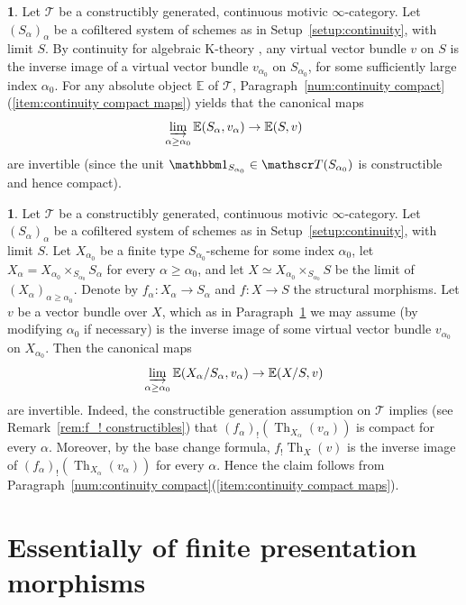 \documentclass[JEP,XML,SOM,Unicode]{cedram}
\newcommand{\T}{\mathscr T}
\newcommand{\E}{\mathbb E}
\newcommand{\un}{\mathbbm 1}
\DeclareMathOperator{\ilim}{\varinjlim}
\DeclareMathOperator{\Th}{Th}
\theoremstyle{remark}
\theoremstyle{definition}
\newtheorem{num}[thm]{}
\numberwithin{equation}{thm}
\begin{document}
\begin{num}\label{num:continuity cohomology}
Let $\T$ be a constructibly generated, continuous motivic $\infty$-category.
Let $(S_\alpha)_\alpha$ be a cofiltered system of schemes as in Setup~\ref{setup:continuity}, with limit $S$.
By continuity for algebraic K-theory \cite[Th.\,7.2]{TT}, any virtual vector bundle $v$ on $S$ is the inverse image of a virtual vector bundle $v_{\alpha_0}$ on $S_{\alpha_0}$, for some sufficiently large index $\alpha_0$.
For any absolute object $\E$ of $\T$, Paragraph~\ref{num:continuity compact}(\ref{item:continuity compact maps}) yields that the canonical maps
\[
\ilim_{\alpha\ge\alpha_0} \E(S_{\alpha}, v_{\alpha})
\to \E(S, v)
\]
are invertible (since the unit $\un_{S_{\alpha_0}} \in \T(S_{\alpha_0})$ is constructible and hence compact).
\end{num}

\begin{num}\label{num:continuity bivariant}
Let $\T$ be a constructibly generated, continuous motivic $\infty$-category.
Let $(S_\alpha)_\alpha$ be a cofiltered system of schemes as in Setup~\ref{setup:continuity}, with limit $S$.
Let $X_{\alpha_0}$ be a finite type $S_{\alpha_0}$-scheme for some index $\alpha_0$, let $X_\alpha = X_{\alpha_0} \times_{S_{\alpha_0}} S_\alpha$ for every $\alpha\ge\alpha_0$, and let $X \simeq X_{\alpha_0} \times_{S_{\alpha_0}} S$ be the limit of $(X_\alpha)_{\alpha\ge\alpha_0}$.
Denote by $f_\alpha : X_\alpha \to S_\alpha$ and $f : X \to S$ the structural morphisms.
Let $v$ be a vector bundle over $X$, which as in Paragraph~\ref{num:continuity cohomology} we may assume (by modifying $\alpha_0$ if necessary) is the inverse image of some virtual vector bundle $v_{\alpha_0}$ on $X_{\alpha_0}$.
Then the canonical maps
\[
\ilim_{\alpha\ge\alpha_0} \E(X_\alpha/S_\alpha, v_\alpha)
\to \E(X/S, v)
\]
are invertible.
Indeed, the constructible generation assumption on $\T$ implies (see Remark~\ref{rem:f_! constructibles}) that $(f_\alpha)_!(\Th_{X_\alpha}(v_\alpha))$ is compact for every $\alpha$.
Moreover, by the base change formula, $f_!\Th_X(v)$ is the inverse image of $(f_\alpha)_!(\Th_{X_\alpha}(v_\alpha))$ for every $\alpha$.
Hence the claim follows from Paragraph~\ref{num:continuity compact}(\ref{item:continuity compact maps}).
\end{num}

\section{Essentially of finite presentation morphisms}
\label{apd:efp}
\end{document}
